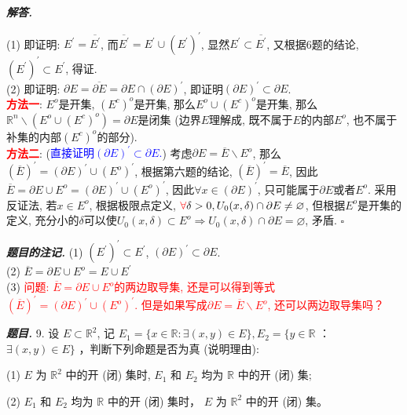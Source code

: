 \documentclass[10pt, a4paper, oneside]{ctexart}
\newenvironment{problem}{\begin{framed}\par\noindent\textbf{\textit{题目. }}}{\end{framed}\par}
\newenvironment{solution}{%
  \par\noindent\textbf{\textit{解答. }}\ignorespaces
}{%
  \hfill\ensuremath{\square}\par %
}
\newenvironment{note}{\par\noindent\textbf{\textit{题目的注记. }}\ignorespaces}{\par}
\begin{document}
\begin{solution}
(1) 即证明: $E^{\prime}=\overline{E^{\prime}}$, 而$\overline{E^{\prime}}=E^{\prime}\cup (E^{\prime})^{\prime}$, 显然$E^{\prime}\subset \overline{E^{\prime}}$, 又根据6题的结论, $(E^{\prime})^{\prime}\subset E^{\prime}$, 得证.\\
(2) 即证明: $\partial E = \overline{\partial E}=\partial E\cap (\partial E)^{\prime}$, 即证明$(\partial E)^{\prime}\subset \partial E$.\\
\textbf{\textcolor{red}{方法一}}: $E^{o}$是开集, $(E^{c})^{o}$是开集, 那么$E^{o}\cup (E^{c})^{o}$是开集, 那么$\mathbb{R}^n \backslash (E^{o}\cup (E^{c})^{o}) = \partial E$是闭集 (边界$E$理解成, 既不属于$E$的内部$E^{o}$, 也不属于补集的内部$(E^{c})^{o}$的部分).\\
\textbf{\textcolor{red}{方法二}}: (\textcolor{blue}{直接证明$(\partial E)^{\prime}\subset \partial E$.}) 考虑$\partial E=\overline{E}\backslash E^{o}$, 那么$(\overline{E})^{\prime}=(\partial E)^{\prime}\cup (E^{o})^{\prime}$, 根据第六题的结论, $(\overline{E})^{\prime}=\overline{E}$, 因此$\overline{E}=\partial E \cup E^{o}= (\partial E)^{\prime}\cup (E^{o})^{\prime}$, 因此$\forall x\in (\partial E)^{\prime}$, 只可能属于$\partial E$或者$E^{o}$. 采用反证法, 若$x\in E^{o}$, 根据极限点定义, $\textcolor{red}{\forall} \delta>0, U_0(x,\delta)\cap \partial E\neq \varnothing$, 但根据$E^{o}$是开集的定义, 充分小的$\delta$可以使$U_0(x,\delta)\subset E^{o}\Rightarrow U_0(x,\delta)\cap \partial E=\varnothing$, 矛盾. 
\end{solution}
\begin{note}
    (1) $(E^{\prime})^{\prime}\subset E^{\prime}$, $(\partial E)^{\prime}\subset \partial E$.\\
    (2) $\overline{E}=\partial E\cup E^{o} = E\cup E^{\prime}$\\
    (3) \textcolor{red}{问题: $\overline{E}=\partial E\cup E^{o} $的两边取导集, 还是可以得到等式$(\overline{E})^{\prime}=(\partial E)^{\prime}\cup (E^{o})^{\prime}$. 但是如果写成$\partial E=\overline{E}\backslash E^{o}$, 还可以两边取导集吗？}
\end{note}

\begin{problem}
9. 设 $E \subset \mathbb{R}^2$, 记 $E_1=\{x \in \mathbb{R}: \exists(x, y) \in E\}, E_2=\{y \in \mathbb{R}$ ： $\exists(x, y) \in E\}$ ，判断下列命题是否为真 (说明理由):

(1) $E$ 为 $\mathbb{R}^2$ 中的开 (闭) 集时, $E_1$ 和 $E_2$ 均为 $\mathbb{R}$ 中的开 (闭) 集;

(2) $E_1$ 和 $E_2$ 均为 $\mathbb{R}$ 中的开 (闭) 集时， $E$ 为 $\mathbb{R}^2$ 中的开 (闭) 集。
\end{problem}
\end{document}

